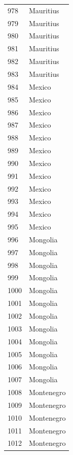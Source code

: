 \documentclass[
  letterpaper,
  DIV=11,
  numbers=noendperiod]{scrreprt}
\begin{document}
\begin{tabular}{ll}
978  &                 Mauritius \\
979  &                 Mauritius \\
980  &                 Mauritius \\
981  &                 Mauritius \\
982  &                 Mauritius \\
983  &                 Mauritius \\
984  &                    Mexico \\
985  &                    Mexico \\
986  &                    Mexico \\
987  &                    Mexico \\
988  &                    Mexico \\
989  &                    Mexico \\
990  &                    Mexico \\
991  &                    Mexico \\
992  &                    Mexico \\
993  &                    Mexico \\
994  &                    Mexico \\
995  &                    Mexico \\
996  &                  Mongolia \\
997  &                  Mongolia \\
998  &                  Mongolia \\
999  &                  Mongolia \\
1000 &                  Mongolia \\
1001 &                  Mongolia \\
1002 &                  Mongolia \\
1003 &                  Mongolia \\
1004 &                  Mongolia \\
1005 &                  Mongolia \\
1006 &                  Mongolia \\
1007 &                  Mongolia \\
1008 &                Montenegro \\
1009 &                Montenegro \\
1010 &                Montenegro \\
1011 &                Montenegro \\
1012 &                Montenegro \\

\end{tabular}
\end{document}
